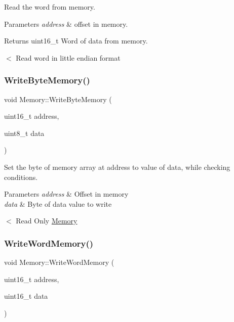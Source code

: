 Read the word from memory. 


\begin{DoxyParams}{Parameters}
{\em address} & offset in memory. \\
\hline
\end{DoxyParams}
\begin{DoxyReturn}{Returns}
uint16\+\_\+t Word of data from memory. 
\end{DoxyReturn}
$<$ Read word in little endian format \mbox{\label{classMemory_a82280ff8234c97746eb14dfcb60f102a}} 
\subsubsection{\texorpdfstring{Write\+Byte\+Memory()}{WriteByteMemory()}}
{\footnotesize\ttfamily void Memory\+::\+Write\+Byte\+Memory (\begin{DoxyParamCaption}\item[{uint16\+\_\+t}]{address,  }\item[{uint8\+\_\+t}]{data }\end{DoxyParamCaption})}



Set the byte of memory array at address to value of data, while checking conditions. 


\begin{DoxyParams}{Parameters}
{\em address} & Offset in memory \\
\hline
{\em data} & Byte of data value to write \\
\hline
\end{DoxyParams}
$<$ Read Only \mbox{\hyperlink{classMemory}{Memory}} \mbox{\label{classMemory_a64cd99f25f9224f17c0a5ee3aaba2887}} 
\subsubsection{\texorpdfstring{Write\+Word\+Memory()}{WriteWordMemory()}}
{\footnotesize\ttfamily void Memory\+::\+Write\+Word\+Memory (\begin{DoxyParamCaption}\item[{uint16\+\_\+t}]{address,  }\item[{uint16\+\_\+t}]{data }\end{DoxyParamCaption})}



